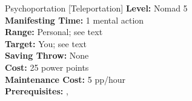 {Psychoportation [Teleportation]}
{
	\textbf{Level:}
	Nomad 5\\
	\textbf{Manifesting Time:}
	1 mental action\\
	\textbf{Range:}
	Personal; see text\\
	\textbf{Target:}
	You; see text\\
	\textbf{Saving Throw:}
	None\\
	\textbf{Cost:}
	25 power points\\
	\textbf{Maintenance Cost:}
	5 pp/hour\\
	\textbf{Prerequisites:}
	, \\
}
